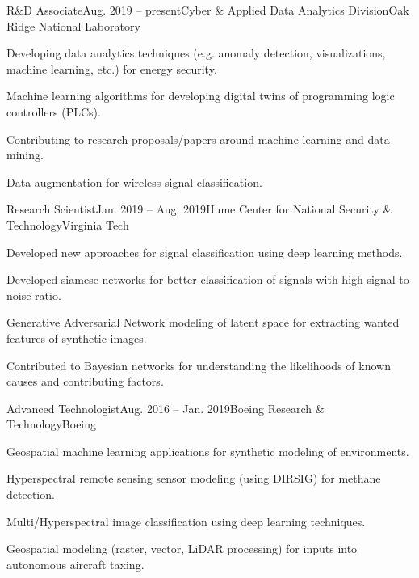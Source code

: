 \documentclass{tidycv} %
\begin{document}
\begin{cvresearches}
\begin{cvresearch}{R{\&}D Associate}{Aug. 2019 -- present}{Cyber \& Applied Data Analytics Division}{Oak Ridge National Laboratory}
 \item Developing data analytics techniques (e.g. anomaly detection, visualizations, machine learning, etc.) for energy security.
 \item Machine learning algorithms for developing digital twins of programming logic controllers (PLCs).
 \item Contributing to research proposals/papers around machine learning and data mining.
 \item Data augmentation for wireless signal classification. 
\end{cvresearch}
\begin{cvresearch}{Research Scientist}{Jan. 2019 -- Aug. 2019}{Hume Center for National Security \& Technology}{Virginia Tech}
 \item Developed new approaches for signal classification using deep learning methods. 
 \item Developed siamese networks for better classification of signals with high signal-to-noise ratio.
 \item Generative Adversarial Network modeling of latent space for extracting wanted features of synthetic images. 
 \item Contributed to Bayesian networks for understanding the likelihoods of known causes and contributing factors. 
\end{cvresearch}

\pagebreak
\begin{cvresearch}{Advanced Technologist}{Aug. 2016 -- Jan. 2019}{Boeing Research \& Technology}{Boeing}
 \item Geospatial machine learning applications for synthetic modeling of environments.
 \item Hyperspectral remote sensing sensor modeling (using DIRSIG) for methane detection.
 \item Multi/Hyperspectral image classification using deep learning techniques. 
 \item Geospatial modeling (raster, vector, LiDAR processing) for inputs into autonomous aircraft taxing. 
\end{cvresearch}

\end{cvresearches}
\end{document}
